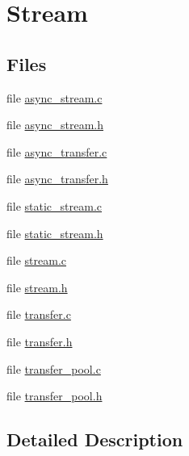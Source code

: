 \hypertarget{group__stream}{\section{Stream}
\label{group__stream}
}
\subsection*{Files}
\begin{DoxyCompactItemize}
\item 
file \hyperlink{async__stream_8c}{async\-\_\-stream.\-c}
\item 
file \hyperlink{async__stream_8h}{async\-\_\-stream.\-h}
\item 
file \hyperlink{async__transfer_8c}{async\-\_\-transfer.\-c}
\item 
file \hyperlink{async__transfer_8h}{async\-\_\-transfer.\-h}
\item 
file \hyperlink{static__stream_8c}{static\-\_\-stream.\-c}
\item 
file \hyperlink{static__stream_8h}{static\-\_\-stream.\-h}
\item 
file \hyperlink{stream_8c}{stream.\-c}
\item 
file \hyperlink{stream_8h}{stream.\-h}
\item 
file \hyperlink{transfer_8c}{transfer.\-c}
\item 
file \hyperlink{transfer_8h}{transfer.\-h}
\item 
file \hyperlink{transfer__pool_8c}{transfer\-\_\-pool.\-c}
\item 
file \hyperlink{transfer__pool_8h}{transfer\-\_\-pool.\-h}
\end{DoxyCompactItemize}


\subsection{Detailed Description}
